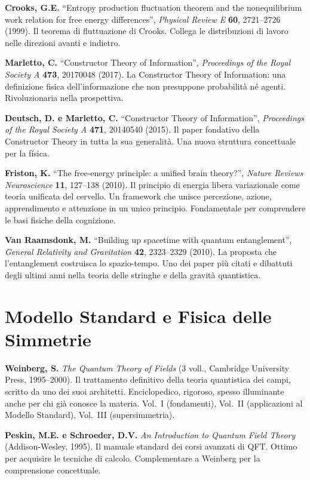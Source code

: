 \documentclass[11.5pt,a4paper,openany]{book}
\theoremstyle{remark}
\begin{document}
\textbf{Crooks, G.E.} ``Entropy production fluctuation theorem and the nonequilibrium work relation for free energy differences'', \textit{Physical Review E} \textbf{60}, 2721--2726 (1999). Il teorema di fluttuazione di Crooks. Collega le distribuzioni di lavoro nelle direzioni avanti e indietro.

\textbf{Marletto, C.} ``Constructor Theory of Information'', \textit{Proceedings of the Royal Society A} \textbf{473}, 20170048 (2017). La Constructor Theory of Information: una definizione fisica dell'informazione che non presuppone probabilità né agenti. Rivoluzionaria nella prospettiva.

\textbf{Deutsch, D. e Marletto, C.} ``Constructor Theory of Information'', \textit{Proceedings of the Royal Society A} \textbf{471}, 20140540 (2015). Il paper fondativo della Constructor Theory in tutta la sua generalità. Una nuova struttura concettuale per la física.

\textbf{Friston, K.} ``The free-energy principle: a unified brain theory?'', \textit{Nature Reviews Neuroscience} \textbf{11}, 127--138 (2010). Il principio di energia libera variazionale come teoria unificata del cervello. Un framework che unisce percezione, azione, apprendimento e attenzione in un unico principio. Fondamentale per comprendere le basi fisiche della cognizione.

\textbf{Van Raamsdonk, M.} ``Building up spacetime with quantum entanglement'', \textit{General Relativity and Gravitation} \textbf{42}, 2323--2329 (2010). La proposta che l'entanglement costruisca lo spazio-tempo. Uno dei paper più citati e dibattuti degli ultimi anni nella teoria delle stringhe e della gravità quantistica.

\section{Modello Standard e Fisica delle Simmetrie}

\textbf{Weinberg, S.} \textit{The Quantum Theory of Fields} (3 voll., Cambridge University Press, 1995--2000). Il trattamento definitivo della teoria quantistica dei campi, scritto da uno dei suoi architetti. Enciclopedico, rigoroso, spesso illuminante anche per chi già conosce la materia. Vol.\ I (fondamenti), Vol.\ II (applicazioni al Modello Standard), Vol.\ III (supersimmetria).

\textbf{Peskin, M.E. e Schroeder, D.V.} \textit{An Introduction to Quantum Field Theory} (Addison-Wesley, 1995). Il manuale standard dei corsi avanzati di QFT. Ottimo per acquisire le tecniche di calcolo. Complementare a Weinberg per la comprensione concettuale.
\end{document}
